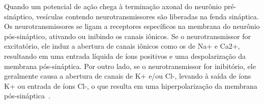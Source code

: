 Quando um potencial de ação chega à terminação axonal do neurônio pré-sináptico, vesículas contendo neurotransmissores são
liberadas na fenda sináptica. Os neurotransmissores se ligam a receptores específicos na membrana do neurônio pós-sináptico,
ativando ou inibindo os canais iônicos. Se o neurotransmissor for excitatório, ele induz a abertura de canais iônicos como os de
Na+ e Ca2+, resultando em uma entrada líquida de íons positivos e uma despolarização da membrana pós-sináptica. Por outro lado, se
o neurotransmissor for inibitório, ele geralmente causa a abertura de canais de K+ e/ou Cl-, levando à saída de íons K+ ou entrada
de íons Cl-, o que resulta em uma hiperpolarização da membrana pós-sináptica~\cite{kandelPrinciples2021}.
